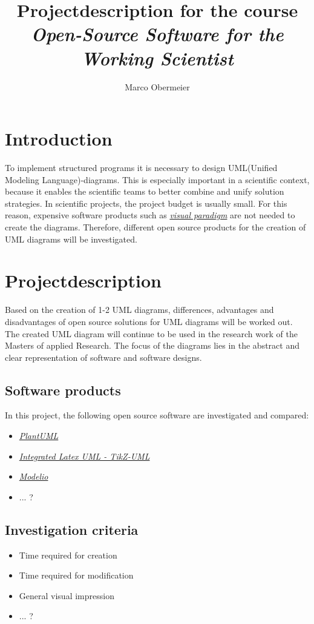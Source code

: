 \documentclass{article}
\title{Projectdescription for the course \\ \textit{Open-Source Software for the Working Scientist}}
\author{Marco Obermeier}
\begin{document}
	\maketitle
	
	\section{Introduction}
	
	To implement structured programs it is necessary to design UML(Unified Modeling Language)-diagrams. 
	This is especially important in a scientific context, because it enables the scientific teams to better combine and unify solution strategies.
	In scientific projects, the project budget is usually small. For this reason, expensive software products such as \href{https://www.visual-paradigm.com/}{\textit{visual paradigm}} are not needed to create the diagrams. Therefore, different open source products for the creation of UML diagrams will be investigated.
	
	
	\section{Projectdescription}
	
	Based on the creation of 1-2 UML diagrams, differences, advantages and disadvantages of open source solutions for UML diagrams will be worked out.
	The created UML diagram will continue to be used in the research work of the Masters of applied Research. 
	The focus of the diagrams lies in the abstract and clear representation of software and software designs.
	
	\subsection{Software products}
	
	In this project, the following open source software are investigated and compared:
	\begin{itemize}
		\item \href{https://plantuml.com/de/}{\textit{PlantUML}}
		\item \href{https://perso.ensta-paris.fr/~kielbasi/tikzuml/index.php}{\textit{Integrated Latex UML - TikZ-UML}}
		\item \href{https://www.modelio.org/}{\textit{Modelio}}
		\item ... ?
	\end{itemize}
	
	
	\subsection{Investigation criteria}

	\begin{itemize}
		\item Time required for creation
		\item Time required for modification
		\item General visual impression
		\item ... ? 
	\end{itemize}
	
	
\end{document}
